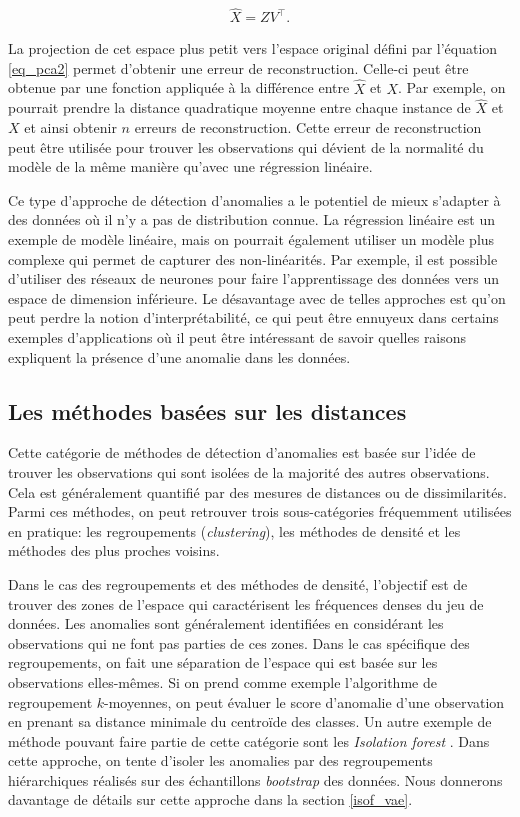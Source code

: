   \begin{gather}  \label{eq_pca2}
 \hat{X} = ZV^\top.
 \end{gather}
 
La projection de cet espace plus petit vers l'espace original défini par l'équation \ref{eq_pca2} permet d'obtenir une erreur de reconstruction. Celle-ci peut être obtenue par une fonction appliquée à la différence entre $\hat{X}$ et $X$. Par exemple, on pourrait prendre la distance quadratique moyenne entre chaque instance de $\hat{X}$ et $X$ et ainsi obtenir $n$ erreurs de reconstruction. Cette erreur de reconstruction peut être utilisée pour trouver les observations qui dévient de la normalité du modèle de la même manière qu'avec une régression linéaire.
  
Ce type d'approche de détection d'anomalies a le potentiel de mieux s'adapter à des données où il n'y a pas de distribution connue. La régression linéaire est un exemple de modèle linéaire, mais on pourrait également utiliser un modèle plus complexe qui permet de capturer des non-linéarités. Par exemple, il est possible d'utiliser des réseaux de neurones pour faire l'apprentissage des données vers un espace de dimension inférieure. Le désavantage avec de telles approches est qu'on peut perdre la notion d'interprétabilité, ce qui peut être ennuyeux dans certains exemples d'applications où il peut être intéressant de savoir quelles raisons expliquent la présence d'une anomalie dans les données.

\subsection{Les méthodes basées sur les distances}

Cette catégorie de méthodes de détection d'anomalies est basée sur l'idée de trouver les observations qui sont isolées de la majorité des autres observations. Cela est généralement quantifié par des mesures de distances ou de dissimilarités. Parmi ces méthodes, on peut retrouver trois	 sous-catégories fréquemment utilisées en pratique: les regroupements (\textit{clustering}), les méthodes de densité et les méthodes des plus proches voisins.

Dans le cas des regroupements et des méthodes de densité, l'objectif est de trouver des zones de l'espace qui caractérisent les fréquences denses du jeu de données. Les anomalies sont généralement identifiées en considérant les observations qui ne font pas parties de ces zones. Dans le cas spécifique des regroupements, on fait une séparation de l'espace qui est basée sur les observations elles-mêmes. Si on prend comme exemple l'algorithme de regroupement $k$-moyennes, on peut évaluer le score d'anomalie d'une observation en prenant sa distance minimale du centroïde des classes. Un autre exemple de méthode pouvant faire partie de cette catégorie sont les \textit{Isolation forest} \citep{4781136}. Dans cette approche, on tente d'isoler les anomalies par des regroupements hiérarchiques réalisés sur des échantillons \textit{bootstrap} des données. Nous donnerons davantage de détails sur cette approche dans la section \ref{isof_vae}.

